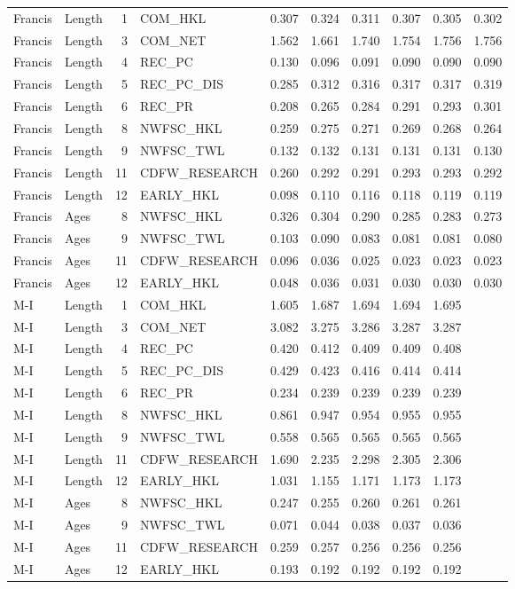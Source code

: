 \documentclass[
  english,
  a4paper,
]{article}
\begin{document}
\begin{landscape}
\begin{longtable}[t]{llrlrrrrrr}
\endfoot
\bottomrule
\endlastfoot
Francis & Length & 1 & COM\_HKL & 0.307 & 0.324 & 0.311 & 0.307 & 0.305 & 0.302\\
Francis & Length & 3 & COM\_NET & 1.562 & 1.661 & 1.740 & 1.754 & 1.756 & 1.756\\
Francis & Length & 4 & REC\_PC & 0.130 & 0.096 & 0.091 & 0.090 & 0.090 & 0.090\\
Francis & Length & 5 & REC\_PC\_DIS & 0.285 & 0.312 & 0.316 & 0.317 & 0.317 & 0.319\\
Francis & Length & 6 & REC\_PR & 0.208 & 0.265 & 0.284 & 0.291 & 0.293 & 0.301\\
Francis & Length & 8 & NWFSC\_HKL & 0.259 & 0.275 & 0.271 & 0.269 & 0.268 & 0.264\\
Francis & Length & 9 & NWFSC\_TWL & 0.132 & 0.132 & 0.131 & 0.131 & 0.131 & 0.130\\
Francis & Length & 11 & CDFW\_RESEARCH & 0.260 & 0.292 & 0.291 & 0.293 & 0.293 & 0.292\\
Francis & Length & 12 & EARLY\_HKL & 0.098 & 0.110 & 0.116 & 0.118 & 0.119 & 0.119\\
Francis & Ages & 8 & NWFSC\_HKL & 0.326 & 0.304 & 0.290 & 0.285 & 0.283 & 0.273\\
Francis & Ages & 9 & NWFSC\_TWL & 0.103 & 0.090 & 0.083 & 0.081 & 0.081 & 0.080\\
Francis & Ages & 11 & CDFW\_RESEARCH & 0.096 & 0.036 & 0.025 & 0.023 & 0.023 & 0.023\\
Francis & Ages & 12 & EARLY\_HKL & 0.048 & 0.036 & 0.031 & 0.030 & 0.030 & 0.030\\
M-I & Length & 1 & COM\_HKL & 1.605 & 1.687 & 1.694 & 1.694 & 1.695 & \\
M-I & Length & 3 & COM\_NET & 3.082 & 3.275 & 3.286 & 3.287 & 3.287 & \\
M-I & Length & 4 & REC\_PC & 0.420 & 0.412 & 0.409 & 0.409 & 0.408 & \\
M-I & Length & 5 & REC\_PC\_DIS & 0.429 & 0.423 & 0.416 & 0.414 & 0.414 & \\
M-I & Length & 6 & REC\_PR & 0.234 & 0.239 & 0.239 & 0.239 & 0.239 & \\
M-I & Length & 8 & NWFSC\_HKL & 0.861 & 0.947 & 0.954 & 0.955 & 0.955 & \\
M-I & Length & 9 & NWFSC\_TWL & 0.558 & 0.565 & 0.565 & 0.565 & 0.565 & \\
M-I & Length & 11 & CDFW\_RESEARCH & 1.690 & 2.235 & 2.298 & 2.305 & 2.306 & \\
M-I & Length & 12 & EARLY\_HKL & 1.031 & 1.155 & 1.171 & 1.173 & 1.173 & \\
M-I & Ages & 8 & NWFSC\_HKL & 0.247 & 0.255 & 0.260 & 0.261 & 0.261 & \\
M-I & Ages & 9 & NWFSC\_TWL & 0.071 & 0.044 & 0.038 & 0.037 & 0.036 & \\
M-I & Ages & 11 & CDFW\_RESEARCH & 0.259 & 0.257 & 0.256 & 0.256 & 0.256 & \\
M-I & Ages & 12 & EARLY\_HKL & 0.193 & 0.192 & 0.192 & 0.192 & 0.192 & \\*
\end{longtable}
\endgroup{}
\end{landscape}
\end{document}
